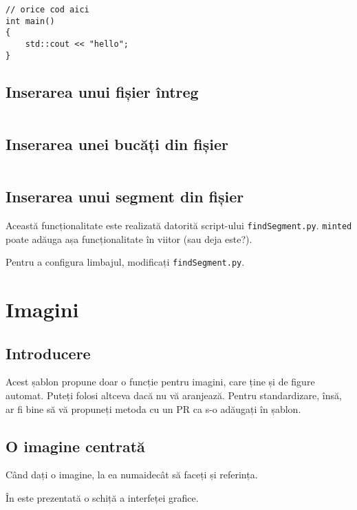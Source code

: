 \documentclass[a4paper,12pt]{report}
\begin{document}
\begin{verbatim}
// orice cod aici
int main()
{
    std::cout << "hello";
}
\end{verbatim}

\subsection{Inserarea unui fișier întreg}

\inputminted[]{zig}{../src/sourcefile.zig}

\subsection{Inserarea unei bucăți din fișier}

\inputminted[firstline=2,lastline=5]{zig}{../src/sourcefile.zig}

\subsection{Inserarea unui segment din fișier}

Această funcționalitate este realizată datorită script-ului \texttt{findSegment.py}.
\verb|minted| poate adăuga așa funcționalitate în viitor (sau deja este?).

Pentru a configura limbajul, modificați \texttt{findSegment.py}.


\section{Imagini}

\subsection{Introducere}

Acest șablon propune doar o funcție pentru imagini, care ține și de figure automat.
Puteți folosi altceva dacă nu vă aranjează.
Pentru standardizare, însă, ar fi bine să vă propuneți metoda cu un \ac{PR} ca s-o adăugați în șablon.

\subsection{O imagine centrată}

Când dați o imagine, la ea numaidecât să faceți și referința.

În  este prezentată o schiță a interfeței grafice.
\end{document}
